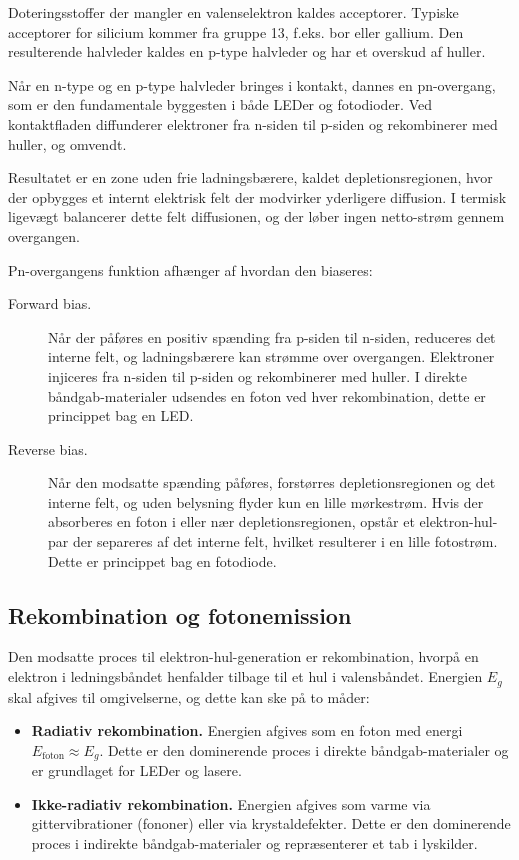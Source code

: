 Doteringsstoffer der mangler en valenselektron kaldes acceptorer. Typiske acceptorer for silicium kommer fra gruppe 13, f.eks. bor eller gallium. Den resulterende halvleder kaldes en p-type halvleder og har et overskud af huller.

Når en n-type og en p-type halvleder bringes i kontakt, dannes en pn-overgang, som er den fundamentale byggesten i både LEDer og fotodioder. Ved kontaktfladen diffunderer elektroner fra n-siden til p-siden og rekombinerer med huller, og omvendt. 

Resultatet er en zone uden frie ladningsbærere, kaldet depletionsregionen, hvor der opbygges et internt elektrisk felt der modvirker yderligere diffusion. I termisk ligevægt balancerer dette felt diffusionen, og der løber ingen netto-strøm gennem overgangen.

Pn-overgangens funktion afhænger af hvordan den biaseres:

\begin{description}
    \item[Forward bias.] Når der påføres en positiv spænding fra p-siden til n-siden, reduceres det interne felt, og ladningsbærere kan strømme over overgangen. Elektroner injiceres fra n-siden til p-siden og rekombinerer med huller. I direkte båndgab-materialer udsendes en foton ved hver rekombination, dette er princippet bag en LED.
    
    \item[Reverse bias.] Når den modsatte spænding påføres, forstørres depletionsregionen og det interne felt, og uden belysning flyder kun en lille mørkestrøm. Hvis der absorberes en foton i eller nær depletionsregionen, opstår et elektron-hul-par der separeres af det interne felt, hvilket resulterer i en lille fotostrøm. Dette er princippet bag en fotodiode.
\end{description}

\subsection{Rekombination og fotonemission}

Den modsatte proces til elektron-hul-generation er rekombination, hvorpå en elektron i ledningsbåndet henfalder tilbage til et hul i valensbåndet. Energien $E_g$ skal afgives til omgivelserne, og dette kan ske på to måder:

\begin{itemize}
    \item \textbf{Radiativ rekombination.} Energien afgives som en foton med energi $E_{\text{foton}} \approx E_g$. Dette er den dominerende proces i direkte båndgab-materialer og er grundlaget for LEDer og lasere.
    
    \item \textbf{Ikke-radiativ rekombination.} Energien afgives som varme via gittervibrationer (fononer) eller via krystaldefekter. Dette er den dominerende proces i indirekte båndgab-materialer og repræsenterer et tab i lyskilder.
\end{itemize}

